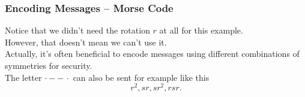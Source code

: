 \documentclass[aspectratio=169,11pt,svgnames]{beamer}
\begin{document}
\begin{frame}
 \frametitle{Encoding Messages -- Morse Code}
 Notice that we didn't need the rotation $r$ at all for this example.\\
 \pause
 However, that doesn't mean we \alert{can't} use it.\\
 \pause
 Actually, it's often beneficial to encode messages using different combinations
 of symmetries for security.\\
 \pause
 The letter $ \cdot - - \, \cdot $ can also be sent for example like this
 \[
  r^2,sr,s r^2,rs r.
 \]
 
\end{frame}
\end{document}

